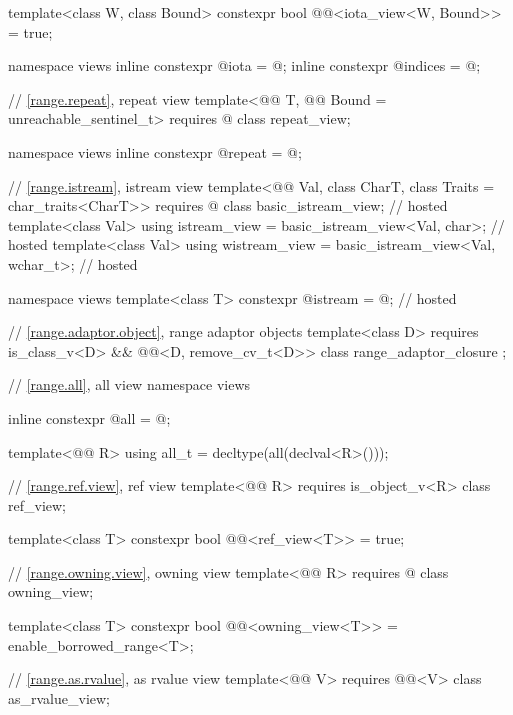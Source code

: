 \begin{codeblock}
{  template<class W, class Bound>
    constexpr bool @@<iota_view<W, Bound>> = true;

  namespace views {
    inline constexpr @\unspecnc@ iota = @\unspecnc@;
    inline constexpr @\unspecnc@ indices = @\unspecnc@;
  }

  // \ref{range.repeat}, repeat view
  template<@@ T, @@ Bound = unreachable_sentinel_t>
    requires @\seebelow@
  class repeat_view;

  namespace views { inline constexpr @\unspecnc@ repeat = @\unspecnc@; }

  // \ref{range.istream}, istream view
  template<@@ Val, class CharT, class Traits = char_traits<CharT>>
    requires @\seebelow@
  class basic_istream_view;                                                         // hosted
  template<class Val>
    using istream_view = basic_istream_view<Val, char>;                             // hosted
  template<class Val>
    using wistream_view = basic_istream_view<Val, wchar_t>;                         // hosted

  namespace views {
    template<class T> constexpr @\unspecnc@ istream = @\unspecnc@;                  // hosted
  }

  // \ref{range.adaptor.object}, range adaptor objects
  template<class D>
    requires is_class_v<D> && @@<D, remove_cv_t<D>>
  class range_adaptor_closure { };

  // \ref{range.all}, all view
  namespace views {
    inline constexpr @\unspecnc@ all = @\unspecnc@;

    template<@@ R>
      using all_t = decltype(all(declval<R>()));
  }

  // \ref{range.ref.view}, ref view
  template<@@ R>
    requires is_object_v<R>
  class ref_view;

  template<class T>
    constexpr bool @@<ref_view<T>> = true;

  // \ref{range.owning.view}, owning view
  template<@@ R>
    requires @\seebelow@
  class owning_view;

  template<class T>
    constexpr bool @@<owning_view<T>> =
      enable_borrowed_range<T>;

  // \ref{range.as.rvalue}, as rvalue view
  template<@@ V>
    requires @@<V>
  class as_rvalue_view;

}
\end{codeblock}
